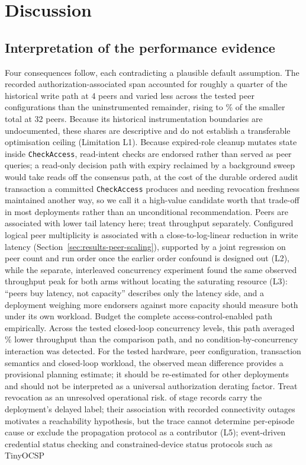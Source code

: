 \section{Discussion}
\label{sec:discussion}

\subsection{Interpretation of the performance evidence}

Four consequences follow, each contradicting a plausible default assumption. The recorded authorization-associated span accounted for roughly a quarter of the historical write path at 4 peers and varied less across the tested peer configurations than the uninstrumented remainder, rising to \SpanSharePeerThirtyTwo\% of the smaller total at 32 peers. Because its historical instrumentation boundaries are undocumented, these shares are descriptive and do not establish a transferable optimisation ceiling (Limitation L1). Because expired-role cleanup mutates state inside \texttt{CheckAccess}, read-intent checks are endorsed rather than served as peer queries; a read-only decision path with expiry reclaimed by a background sweep would take reads off the consensus path, at the cost of the durable ordered audit transaction a committed \texttt{CheckAccess} produces and needing revocation freshness maintained another way, so we call it a high-value candidate worth that trade-off in most deployments rather than an unconditional recommendation. Peers are associated with lower tail latency here; treat throughput separately. Configured logical peer multiplicity is associated with a close-to-log-linear reduction in write latency (Section~\ref{sec:results-peer-scaling}), supported by a joint regression on peer count and run order once the earlier order confound is designed out (L2), while the separate, interleaved concurrency experiment found the same observed throughput peak for both arms without locating the saturating resource (L3): ``peers buy latency, not capacity'' describes only the latency side, and a deployment weighing more endorsers against more capacity should measure both under its own workload. Budget the complete access-control-enabled path empirically. Across the tested closed-loop concurrency levels, this path averaged \ThroughputPctDiffMean\% lower throughput than the comparison path, and no condition-by-concurrency interaction was detected. For the tested hardware, peer configuration, transaction semantics and closed-loop workload, the observed mean difference provides a provisional planning estimate; it should be re-estimated for other deployments and should not be interpreted as a universal authorization derating factor. Treat revocation as an unresolved operational risk. \RevocationDelayedCount{} of \RevocationStageRecords{} stage records carry the deployment's delayed label; their association with recorded connectivity outages motivates a reachability hypothesis, but the trace cannot determine per-episode cause or exclude the propagation protocol as a contributor (L5); event-driven credential status checking \citep{w3c2024bitstring} and constrained-device status protocols such as TinyOCSP \citep{fedrecheski2023tinyocsp} 
